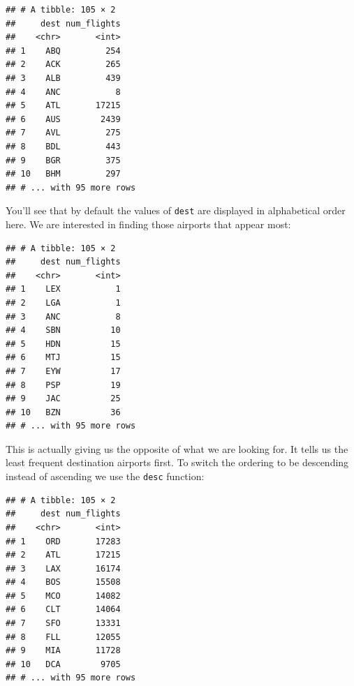 \documentclass[]{tufte-book}
\newenvironment{Shaded}{\begin{snugshade}}{\end{snugshade}}
\newcommand{\KeywordTok}[1]{\textcolor[rgb]{0.13,0.29,0.53}{\textbf{{#1}}}}
\newcommand{\StringTok}[1]{\textcolor[rgb]{0.31,0.60,0.02}{{#1}}}
\newcommand{\NormalTok}[1]{{#1}}
\begin{document}
\begin{verbatim}
## # A tibble: 105 × 2
##     dest num_flights
##    <chr>       <int>
## 1    ABQ         254
## 2    ACK         265
## 3    ALB         439
## 4    ANC           8
## 5    ATL       17215
## 6    AUS        2439
## 7    AVL         275
## 8    BDL         443
## 9    BGR         375
## 10   BHM         297
## # ... with 95 more rows
\end{verbatim}

You'll see that by default the values of \texttt{dest} are displayed in
alphabetical order here. We are interested in finding those airports
that appear most:

\begin{Shaded}
\end{Shaded}

\begin{verbatim}
## # A tibble: 105 × 2
##     dest num_flights
##    <chr>       <int>
## 1    LEX           1
## 2    LGA           1
## 3    ANC           8
## 4    SBN          10
## 5    HDN          15
## 6    MTJ          15
## 7    EYW          17
## 8    PSP          19
## 9    JAC          25
## 10   BZN          36
## # ... with 95 more rows
\end{verbatim}

This is actually giving us the opposite of what we are looking for. It
tells us the least frequent destination airports first. To switch the
ordering to be descending instead of ascending we use the \texttt{desc}
function:

\begin{Shaded}
\end{Shaded}

\begin{verbatim}
## # A tibble: 105 × 2
##     dest num_flights
##    <chr>       <int>
## 1    ORD       17283
## 2    ATL       17215
## 3    LAX       16174
## 4    BOS       15508
## 5    MCO       14082
## 6    CLT       14064
## 7    SFO       13331
## 8    FLL       12055
## 9    MIA       11728
## 10   DCA        9705
## # ... with 95 more rows
\end{verbatim}
\end{document}
